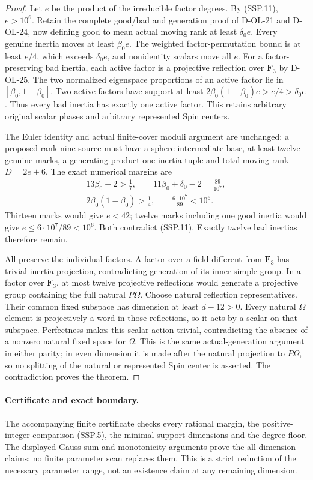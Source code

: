 \begin{proof}
Let $e$ be the product of the irreducible factor degrees.
By (SSP.11), $e>10^6$.
Retain the complete good/bad and generation proof of
D-OL-21 and D-OL-24, now defining good to mean actual
moving rank at least $\delta_0e$.
Every genuine inertia moves at least $\beta_0e$.
The weighted factor-permutation bound is at least $e/4$,
which exceeds $\delta_0e$, and nonidentity scalars move all $e$.
For a factor-preserving bad inertia, each active factor is
a projective reflection over $\mathbf F_3$ by D-OL-25.
The two normalized eigenspace proportions of an active
factor lie in $[\beta_0,1-\beta_0]$.
Two active factors have support at least
$2\beta_0(1-\beta_0)e>e/4>\delta_0e$.
Thus every bad inertia has exactly one active factor.
This retains arbitrary original scalar phases and arbitrary
represented Spin centers.

The Euler identity and actual finite-cover moduli argument
are unchanged: a proposed rank-nine source must have a
sphere intermediate base, at least twelve genuine marks,
a generating product-one inertia tuple and total moving
rank $D=2e+6$.
The exact numerical margins are
\[
 \begin{gathered}
 13\beta_0-2>\frac17,\qquad
 11\beta_0+\delta_0-2=\frac{89}{10^7},\\
 2\beta_0(1-\beta_0)>\frac14,\qquad
 \frac{6\cdot10^7}{89}<10^6.
 \end{gathered}                                             \tag{SSP.12}
\]
Thirteen marks would give $e<42$; twelve marks including
one good inertia would give $e\le6\cdot10^7/89<10^6$.
Both contradict (SSP.11).  Exactly twelve bad inertias
therefore remain.

All preserve the individual factors.  A factor over a
field different from $\mathbf F_3$ has trivial inertia
projection, contradicting generation of its inner simple
group.  In a factor over $\mathbf F_3$, at most twelve
projective reflections would generate a projective group
containing the full natural $P\Omega$.
Choose natural reflection representatives.  Their common
fixed subspace has dimension at least $d-12>0$.
Every natural $\Omega$ element is projectively a word
in those reflections, so it acts by a scalar on that
subspace.  Perfectness makes this scalar action trivial,
contradicting the absence of a nonzero natural fixed
space for $\Omega$.  This is the same actual-generation
argument in either parity; in even dimension it is made
after the natural projection to $P\Omega$, so no splitting
of the natural or represented Spin center is asserted.
The contradiction proves the theorem.
\end{proof}

\paragraph{Certificate and exact boundary.}
The accompanying finite certificate checks every rational
margin, the positive-integer comparison (SSP.5), the minimal
support dimensions and the degree floor.  The displayed
Gauss-sum and monotonicity arguments prove the all-dimension
claims; no finite parameter scan replaces them.
This is a strict reduction of the necessary parameter range,
not an existence claim at any remaining dimension.
